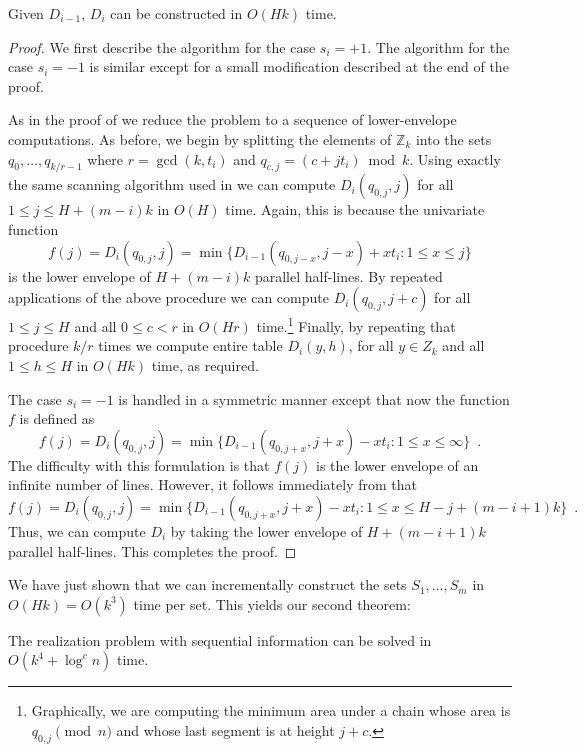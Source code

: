 \documentclass[11pt]{patmorin}
\newcommand{\Z}{\mathbb{Z}}
\begin{document}
\begin{lem}
Given $D_{i-1}$, $D_i$ can be constructed in $O(Hk)$ time.
\end{lem}

\begin{proof}
We first describe the algorithm for the case $s_i=+1$. The algorithm
for the case $s_i=-1$ is similar except for a small modification
described at the end of the proof.

As in the proof of  we reduce the problem to a 
sequence of lower-envelope
computations.   As before, we begin by
splitting the elements of $\Z_k$ into the sets
$q_{0},\ldots,q_{k/r-1}$ where $r=\gcd(k,t_i)$ and
$q_{c,j}=(c+jt_i)\bmod k$.
Using exactly the same scanning algorithm used in  we
can compute $D_i(q_{0,j},j)$ for all $1\le j\le H+(m-i)k$ in $O(H)$ time.
Again, this is because the univariate function
\[ f(j) = D_i(q_{0,j},j) = \min\{ D_{i-1}(q_{0,j-x},j-x) + xt_i : 1\le
x\le j\} 
\]
is the lower envelope of $H+(m-i)k$ parallel half-lines.  By repeated
applications of the above procedure we can compute $D_i(q_{0,j},j+c)$
for all $1\le j\le H$ and all $0\le c< r$ in $O(Hr)$
time.\footnote{Graphically, we are computing the minimum area under a
chain whose area is $q_{0,j} \pmod{n}$ and whose last segment is at
height $j+c$.}
Finally, by repeating that
procedure $k/r$ times we compute entire table $D_i(y,h)$, for all
$y\in Z_k$ and all $1\le h\le H$ in $O(Hk)$ time, as required. 

The case $s_{i}=-1$ is handled in a symmetric manner except that now
the function $f$ is defined as
\[
  f(j) = D_{i}(q_{0,j},j) = \min\{D_{i-1}(q_{0,j+x},j+x) - xt_i :
1\le x\le \infty\} \enspace .
\]
The difficulty with this formulation is that $f(j)$ is the lower
envelope of an infinite number of lines.  However, it follows immediately from  that 
\[
  f(j) = D_{i}(q_{0,j},j) = \min\{D_{i-1}(q_{0,j+x},j+x) - xt_i :
1\le x\le H-j+(m-i+1)k\} \enspace .
\]
Thus, we can compute $D_i$ by taking the lower envelope of
$H+(m-i+1)k$ parallel half-lines.  This completes the proof.
\end{proof}

We have just shown that we can incrementally construct the sets
$S_1,\ldots,S_m$ in $O(Hk)=O(k^3)$ time per set.  This yields our
second theorem:

\begin{thm}
The realization problem with sequential information can be solved in
$O(k^4+\log^c n)$ time.
\end{thm}
\end{document}
